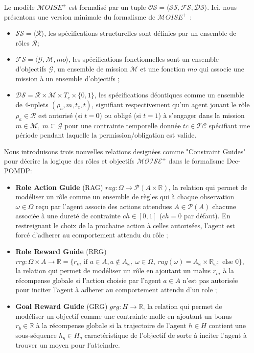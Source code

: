 \documentclass[sigconf,anonymous]{aamas}
\begin{document}
Le modèle $\mathcal{M}OISE^+$ est formalisé par un tuple $\mathcal{OS} = \langle \mathcal{SS}, \mathcal{FS}, \mathcal{DS} \rangle$. Ici, nous présentons une version minimale du formalisme de $\mathcal{M}OISE^+$ :
\begin{itemize}
    \item $\mathcal{SS} = \langle \mathcal{R} \rangle$, les spécifications structurelles sont définies par un ensemble de rôles $\mathcal{R}$;
    \item $\mathcal{FS} = \langle \mathcal{G}, \mathcal{M}, mo \rangle$, les spécifications fonctionnelles sont un ensemble d'objectifs $\mathcal{G}$, un ensemble de mission $\mathcal{M}$ et une fonction $mo$ qui associe une mission à un ensemble d'objectifs ;
    \item $\mathcal{DS} = \mathcal{R} \times \mathcal{M} \times T_c \times \{0,1\}$, les spécifications déontiques comme un ensemble de 4-uplets $(\rho_a, m, t_c, t)$, signifiant respectivement qu'un agent jouant le rôle $\rho_a \in \mathcal{R}$ est autorisé (si $t = 0$) ou obligé (si $t = 1$) à s'engager dans la mission $m \in \mathcal{M}, \ m \subseteq \mathcal{G}$ pour une contrainte temporelle donnée $tc \in \mathcal{TC}$ spécifiant une période pendant laquelle la permission/obligation est valide.
\end{itemize}

Nous introduisons trois nouvelles relations designées comme "Constraint Guides" pour décrire la logique des rôles et objectifs $\mathcal{\mathcal{M}OISE^+}$ dans le formalisme Dec-POMDP:

\begin{itemize}
    \item \textbf{Role Action Guide} (RAG) \quad $rag: \Omega \rightarrow \mathcal{P}(A \times \mathbb{R})$, la relation qui permet de modéliser un rôle comme un ensemble de règles qui à chaque observation $\omega \in \Omega$ reçu par l'agent associe des actions attendues $A \in \mathcal{P}(A)$ chacune associée à une dureté de contrainte $ch \in [0,1]$ ($ch = 0$ par défaut). En restreignant le choix de la prochaine action à celles autorisées, l'agent est forcé d'adherer au comportement attendu du rôle ;
    \item \textbf{Role Reward Guide} (RRG) \quad $rrg: \Omega \times A \to \mathbb{R} = \{r_m \text{ if } a \in A, a \notin A_\omega, \ \omega \in \Omega, \ rag(\omega) = A_\omega \times \mathbb{R_\omega}; \text{ else } 0\}$, la relation qui permet de modéliser un rôle en ajoutant un malus $r_m$ à la récompense globale si l'action choisie par l'agent $a \in A$ n'est pas autorisée pour inciter l'agent à adherer au comportement attendu d'un role ;
    \item \textbf{Goal Reward Guide} (GRG) \quad $grg: H \rightarrow \mathbb{R}$, la relation qui permet de modéliser un objectif comme une contrainte molle en ajoutant un bonus $r_b \in \mathbb{R}$ à la récompense globale si la trajectoire de l'agent $h \in H$ contient une sous-séquence $h_g \in H_g$ caractéristique de l'objectif de sorte à inciter l'agent à trouver un moyen pour l'atteindre.
\end{itemize}
\end{document}
